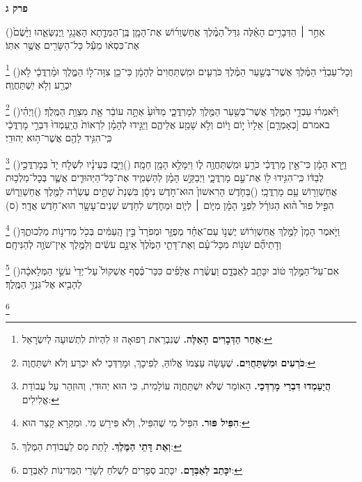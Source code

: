 \documentclass[12pt, openany]{book}
\newcommand{\chapname}{}
\newcommand{\newchap}[1]{
	\addcontentsline{toc}{chapter}{#1}
	\renewcommand{\chapname}{#1}
		\begin{center}
			\textbf{%
\fontsize{16pt}{16pt}\selectfont
				#1}
		\end{center}
}
\newcommand{\footnotecomment}[1]{
	\renewcommand\thefootnote{}
	\footnote{\textsf{#1}}}
\newcommand{\commenta}[1]{\footnotecomment{#1}\hspace{0em}}
\newcommand{\vsnum}[1]{(\hebrewnumeral{#1})\space}
\begin{document}
\newchap{פרק ג}
\begin{multicols}{2}
\vsnum{1}אַחַ֣ר ׀ הַדְּבָרִ֣ים הָאֵ֗לֶּה גִּדַּל֩ הַמֶּ֨לֶךְ אֲחַשְׁוֵר֜וֹשׁ אֶת־הָמָ֧ן בֶּֽן־הַמְּדָ֛תָא הָאֲגָגִ֖י וַֽיְנַשְּׂאֵ֑הוּ וַיָּ֙שֶׂם֙ אֶת־כִּסְא֔וֹ מֵעַ֕ל כָּל־הַשָּׂרִ֖ים אֲשֶׁ֥ר אִתּֽוֹ׃%
\commenta{\textrm{\textbf{אַחַר הַדְּבָרִים הָאֵלֶּה.}} שֶׁנִבְרֵאת רְפוּאָה זוּ לִהְיוֹת לִתְשׁוּעָה לְיִשְׂרָאֵל: }%
\vsnum{2}וְכָל־עַבְדֵ֨י הַמֶּ֜לֶךְ אֲשֶׁר־בְּשַׁ֣עַר הַמֶּ֗לֶךְ כֹּרְעִ֤ים וּמִֽשְׁתַּחֲוִים֙ לְהָמָ֔ן כִּי־כֵ֖ן צִוָּה־ל֣וֹ הַמֶּ֑לֶךְ וּמָ֨רְדֳּכַ֔י לֹ֥א יִכְרַ֖ע וְלֹ֥א יִֽשְׁתַּחֲוֶֽה׃%
\commenta{\textrm{\textbf{כֹּרְעִים וּמִשְׁתַּחֲוִים.}} שֶׁעָשָׂה עַצְמוֹ אֱלוֹהַּ, לְפִיכָךְ, וּמָרְדְּכַי לֹא יִכְרַע וְלֹא יִשְׁתַּחֲוֶה: }%
\vsnum{3}וַיֹּ֨אמְר֜וּ עַבְדֵ֥י הַמֶּ֛לֶךְ אֲשֶׁר־בְּשַׁ֥עַר הַמֶּ֖לֶךְ לְמָרְדֳּכָ֑י מַדּ֙וּעַ֙ אַתָּ֣ה עוֹבֵ֔ר אֵ֖ת מִצְוַ֥ת הַמֶּֽלֶךְ׃
\vsnum{4}וַיְהִ֗י באמרם [כְּאָמְרָ֤ם] אֵלָיו֙ י֣וֹם וָי֔וֹם וְלֹ֥א שָׁמַ֖ע אֲלֵיהֶ֑ם וַיַּגִּ֣ידוּ לְהָמָ֗ן לִרְאוֹת֙ הֲיַֽעַמְדוּ֙ דִּבְרֵ֣י מָרְדֳּכַ֔י כִּֽי־הִגִּ֥יד לָהֶ֖ם אֲשֶׁר־ה֥וּא יְהוּדִֽי׃%
\commenta{\textrm{\textbf{הֲיַעַמְדוּ דִּבְרֵי מָרְדְּכַי.}} הָאוֹמֵר שֶׁלֹּא יִשְׁתַּחֲוֶה עוֹלָמִית, כִּי הוּא יְהוּדִי, וְהוּזְהַר עַל עֲבוֹדַת אֱלִילִים: }%
\vsnum{5}וַיַּ֣רְא הָמָ֔ן כִּי־אֵ֣ין מָרְדֳּכַ֔י כֹּרֵ֥עַ וּמִֽשְׁתַּחֲוֶ֖ה ל֑וֹ וַיִּמָּלֵ֥א הָמָ֖ן חֵמָֽה׃
\vsnum{6}וַיִּ֣בֶז בְּעֵינָ֗יו לִשְׁלֹ֤ח יָד֙ בְּמָרְדֳּכַ֣י לְבַדּ֔וֹ כִּֽי־הִגִּ֥ידוּ ל֖וֹ אֶת־עַ֣ם מָרְדֳּכָ֑י וַיְבַקֵּ֣שׁ הָמָ֗ן לְהַשְׁמִ֧יד אֶת־כָּל־הַיְּהוּדִ֛ים אֲשֶׁ֛ר בְּכָל־מַלְכ֥וּת אֲחַשְׁוֵר֖וֹשׁ עַ֥ם מָרְדֳּכָֽי׃
\vsnum{7}בַּחֹ֤דֶשׁ הָרִאשׁוֹן֙ הוּא־חֹ֣דֶשׁ נִיסָ֔ן בִּשְׁנַת֙ שְׁתֵּ֣ים עֶשְׂרֵ֔ה לַמֶּ֖לֶךְ אֲחַשְׁוֵר֑וֹשׁ הִפִּ֣יל פּוּר֩ ה֨וּא הַגּוֹרָ֜ל לִפְנֵ֣י הָמָ֗ן מִיּ֧וֹם ׀ לְי֛וֹם וּמֵחֹ֛דֶשׁ לְחֹ֥דֶשׁ שְׁנֵים־עָשָׂ֖ר הוּא־חֹ֥דֶשׁ אֲדָֽר׃ (ס)%
\commenta{\textrm{\textbf{הִפִּיל פּוּר.}} הִפִּיל מִי שֶׁהִפִּיל, וְלֹא פִּירֵשׁ מִי. וּמִקְרָא קָצֵר הוּא: }%
\vsnum{8}וַיֹּ֤אמֶר הָמָן֙ לַמֶּ֣לֶךְ אֲחַשְׁוֵר֔וֹשׁ יֶשְׁנ֣וֹ עַם־אֶחָ֗ד מְפֻזָּ֤ר וּמְפֹרָד֙ בֵּ֣ין הָֽעַמִּ֔ים בְּכֹ֖ל מְדִינ֣וֹת מַלְכוּתֶ֑ךָ וְדָתֵיהֶ֞ם שֹׁנ֣וֹת מִכָּל־עָ֗ם וְאֶת־דָּתֵ֤י הַמֶּ֙לֶךְ֙ אֵינָ֣ם עֹשִׂ֔ים וְלַמֶּ֥לֶךְ אֵין־שֹׁוֶ֖ה לְהַנִּיחָֽם׃%
\commenta{\textrm{\textbf{וְאֶת דָּתֵי הַמֶּלֶךְ.}} לָתֵת מַס לַעֲבוֹדַת הַמֶּלֶךְ:}%
\vsnum{9}אִם־עַל־הַמֶּ֣לֶךְ ט֔וֹב יִכָּתֵ֖ב לְאַבְּדָ֑ם וַעֲשֶׂ֨רֶת אֲלָפִ֜ים כִּכַּר־כֶּ֗סֶף אֶשְׁקוֹל֙ עַל־יְדֵי֙ עֹשֵׂ֣י הַמְּלָאכָ֔ה לְהָבִ֖יא אֶל־גִּנְזֵ֥י הַמֶּֽלֶךְ׃%
\commenta{\textrm{\textbf{יִכָּתֵב לְאַבְּדָם.}} יִכָּתֵב סְפָרִים לִשְׁלֹחַ לְשָׂרֵי הַמְּדִינוֹת לְאַבְּדָם:}%

\end{multicols}
\end{document}
